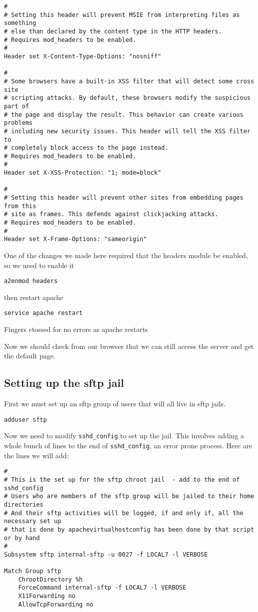 \documentclass[12pt, a4paper]{article}
\begin{document}
\begin{verbatim}
# 
# Setting this header will prevent MSIE from interpreting files as something 
# else than declared by the content type in the HTTP headers. 
# Requires mod_headers to be enabled. 
# 
Header set X-Content-Type-Options: "nosniff" 

# 
# Some browsers have a built-in XSS filter that will detect some cross site 
# scripting attacks. By default, these browsers modify the suspicious part of 
# the page and display the result. This behavior can create various problems 
# including new security issues. This header will tell the XSS filter to 
# completely block access to the page instead. 
# Requires mod_headers to be enabled. 
# 
Header set X-XSS-Protection: "1; mode=block" 

# 
# Setting this header will prevent other sites from embedding pages from this 
# site as frames. This defends against clickjacking attacks. 
# Requires mod_headers to be enabled. 
# 
Header set X-Frame-Options: "sameorigin"
\end{verbatim}


One of the changes we made here required that the headers module be enabled, so we need to enable it

\begin{verbatim}
a2enmod headers
\end{verbatim}

then restart apache

\begin{verbatim}
service apache restart
\end{verbatim}

Fingers ctossed for no errors as apache restarts

Now we should check from our browser that we can still access the server and get the default page.

\subsection*{Setting up the sftp jail}

First we must set up an sftp group of users that will all live in sftp jails.
\begin{verbatim}
adduser sftp
\end{verbatim}

Now we need to modify \verb|sshd_config| to set up the jail. This involves adding a whole bunch of lines to the end of \verb|sshd_config|, an error prone process.
Here are the lines we will add:

\begin{verbatim}
# 
# This is the set up for the sftp chroot jail  - add to the end of sshd_config 
# Users who are members of the sftp group will be jailed to their home directories 
# And their sftp activities will be logged, if and only if, all the necessary set up 
# that is done by apachevirtualhostconfig has been done by that script or by hand 
# 
Subsystem sftp internal-sftp -u 0027 -f LOCAL7 -l VERBOSE 

Match Group sftp 
    ChrootDirectory %h 
    ForceCommand internal-sftp -f LOCAL7 -l VERBOSE 
    X11Forwarding no 
    AllowTcpForwarding no
\end{verbatim}
\end{document}
